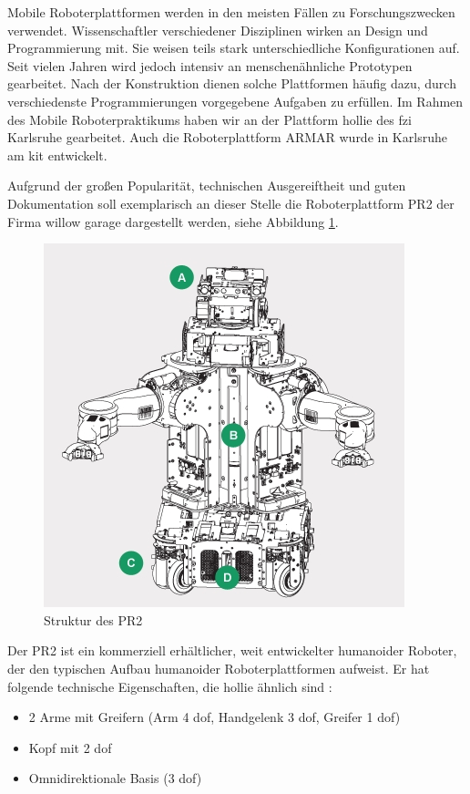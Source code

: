 Mobile Roboterplattformen werden in den meisten Fällen zu Forschungszwecken verwendet.
Wissenschaftler verschiedener Disziplinen wirken an Design und Programmierung mit.
Sie weisen teils stark unterschiedliche Konfigurationen auf.
Seit vielen Jahren wird jedoch intensiv an menschenähnliche Prototypen gearbeitet.
Nach der Konstruktion dienen solche Plattformen häufig dazu, durch verschiedenste Programmierungen vorgegebene Aufgaben zu erfüllen.
Im Rahmen des Mobile Roboterpraktikums haben wir an der Plattform \gls{hollie} des \gls{fzi} Karlsruhe gearbeitet.
Auch die Roboterplattform ARMAR wurde in Karlsruhe am \gls{kit} entwickelt.

Aufgrund der großen Popularität, technischen Ausgereiftheit und guten Dokumentation soll exemplarisch an dieser Stelle die Roboterplattform PR2 der Firma willow garage dargestellt werden, siehe Abbildung  \ref{fig:PR2Struktur}.

\begin{figure}[h]
\center
\includegraphics[scale=0.5]{graphics/PR2Struktur.jpg}
\caption{\label{fig:PR2Struktur} Struktur des PR2 \cite{kinect_5}}
\end{figure}

Der PR2 ist ein kommerziell erhältlicher, weit entwickelter humanoider Roboter, der den typischen Aufbau humanoider Roboterplattformen aufweist.
Er hat folgende technische Eigenschaften, die \gls{hollie} ähnlich sind \cite{kinect_5}:

\begin{itemize}
  \item 2 Arme mit Greifern (Arm 4 \gls{dof}, Handgelenk 3 \gls{dof}, Greifer 1 \gls{dof})
  \item Kopf mit 2 \gls{dof}
  \item Omnidirektionale Basis (3 \gls{dof})
\end{itemize}

